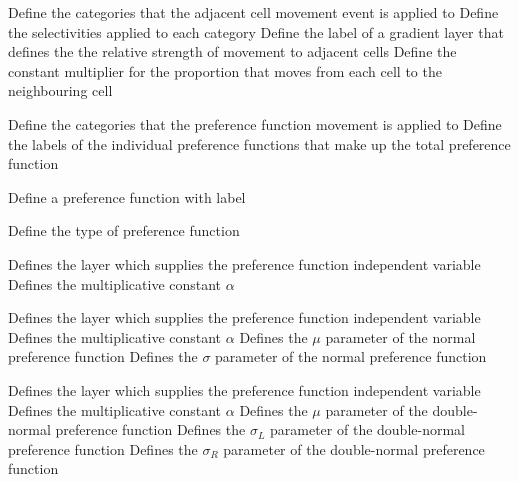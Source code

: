 \par\textbf{}\par
{} {Define the categories that the adjacent cell movement event is applied to}
 {Define the selectivities applied to each category}
 {Define the label of a gradient layer that defines the the relative strength of movement to adjacent cells}
 {Define the constant multiplier for the proportion that moves from each cell to the neighbouring cell}
\par\textbf{}\par
{} {Define the categories that the preference function movement is applied to}
 {Define the labels of the individual  preference functions that make up the total preference function}
\par{} {Define a preference function with label}\par
{} {Define the type of preference function}
\par\textbf{}\par
{} {Defines the layer which supplies the preference function independent variable}
 {Defines the multiplicative constant $\alpha$}
\par\textbf{}\par
{} {Defines the layer which supplies the preference function independent variable}
 {Defines the multiplicative constant $\alpha$}
 {Defines the $\mu$ parameter of the normal preference function}
 {Defines the $\sigma$ parameter of the normal preference function}
\par\textbf{}\par
{} {Defines the layer which supplies the preference function independent variable}
 {Defines the multiplicative constant $\alpha$}
 {Defines the $\mu$ parameter of the double-normal preference function}
 {Defines the $\sigma_L$ parameter of the double-normal preference function}
 {Defines the $\sigma_R$ parameter of the double-normal preference function}
\par\textbf{}\par
